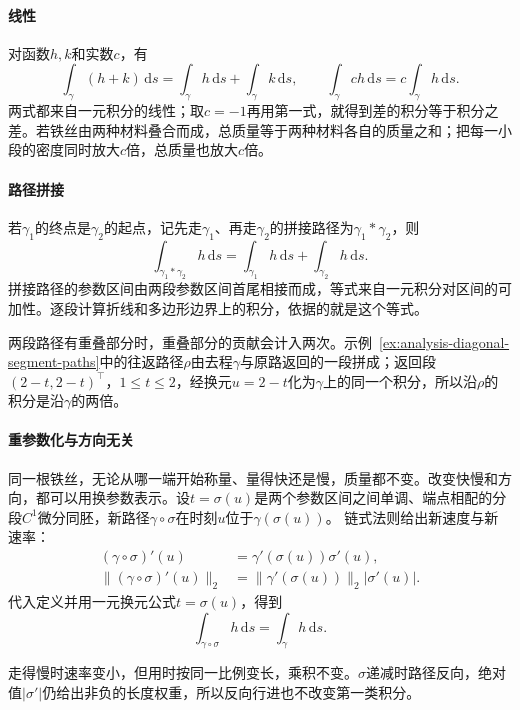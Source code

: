 \paragraph{线性}

对函数$h,k$和实数$c$，有
\[
 \int_\gamma(h+k)\,\mathrm ds=\int_\gamma h\,\mathrm ds+\int_\gamma k\,\mathrm ds,
 \qquad
 \int_\gamma ch\,\mathrm ds=c\int_\gamma h\,\mathrm ds.
\]
两式都来自一元积分的线性；取$c=-1$再用第一式，就得到差的积分等于积分之差。若铁丝由两种材料叠合而成，总质量等于两种材料各自的质量之和；把每一小段的密度同时放大$c$倍，总质量也放大$c$倍。

\paragraph{路径拼接}

若$\gamma_1$的终点是$\gamma_2$的起点，记先走$\gamma_1$、再走$\gamma_2$的拼接路径为$\gamma_1*\gamma_2$，则
\[
 \int_{\gamma_1*\gamma_2}h\,\mathrm ds
 =\int_{\gamma_1}h\,\mathrm ds+\int_{\gamma_2}h\,\mathrm ds.
\]
拼接路径的参数区间由两段参数区间首尾相接而成，等式来自一元积分对区间的可加性。逐段计算折线和多边形边界上的积分，依据的就是这个等式。

两段路径有重叠部分时，重叠部分的贡献会计入两次。示例~\ref{ex:analysis-diagonal-segment-paths}中的往返路径$\rho$由去程$\gamma$与原路返回的一段拼成；返回段$(2-t,2-t)^\top$，$1\leq t\leq2$，经换元$u=2-t$化为$\gamma$上的同一个积分，所以沿$\rho$的积分是沿$\gamma$的两倍。

\paragraph{重参数化与方向无关}

同一根铁丝，无论从哪一端开始称量、量得快还是慢，质量都不变。改变快慢和方向，都可以用换参数表示。设$t=\sigma(u)$是两个参数区间之间单调、端点相配的分段$C^1$微分同胚，新路径$\gamma\circ\sigma$在时刻$u$位于$\gamma(\sigma(u))$。
链式法则给出新速度与新速率：
\[
 \begin{aligned}
 (\gamma\circ\sigma)'(u)&=\gamma'(\sigma(u))\sigma'(u),\\
 \lVert(\gamma\circ\sigma)'(u)\rVert_2&=\lVert\gamma'(\sigma(u))\rVert_2|\sigma'(u)| .
 \end{aligned}
\]
代入定义并用一元换元公式$t=\sigma(u)$，得到
\[
 \int_{\gamma\circ\sigma}h\,\mathrm ds=\int_\gamma h\,\mathrm ds.
\]

走得慢时速率变小，但用时按同一比例变长，乘积不变。$\sigma$递减时路径反向，绝对值$|\sigma'|$仍给出非负的长度权重，所以反向行进也不改变第一类积分。

